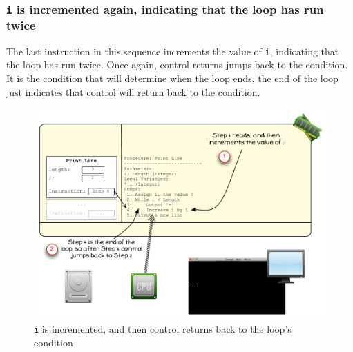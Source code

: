 \clearpage

\subsubsection{\texttt{i} is incremented again, indicating that the loop has run twice} %
\label{ssub:i_is_incremented_again_indicating_that_the_loop_has_run_twice}

The last instruction in this sequence increments the value of \texttt{i}, indicating that the loop has run twice. Once again, control returns jumps back to the condition. It is the condition that will determine when the loop ends, the end of the loop just indicates that control will return back to the condition.

\begin{figure}[htbp]
   \centering
   \includegraphics[width=\textwidth]{./topics/control-flow/images/PrintLine7} 
   \caption{\texttt{i} is incremented, and then control returns back to the loop's condition}
   \label{fig:print-line-7}
\end{figure}


